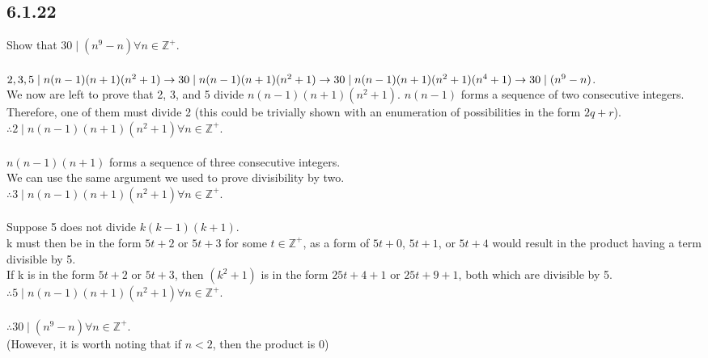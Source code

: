 \documentclass{article}
\begin{document}
\subsection{6.1.22}
Show that $30 \mid (n^9 - n)$\;\;$ \forall n \in \mathbb{Z}^+$.
\\
\\$2,3,5 \mid n(n-1)(n+1)(n^2+1) \rightarrow
\\30 \mid n(n-1)(n+1)(n^2+1) \rightarrow
\\30 \mid n(n-1)(n+1)(n^2+1)(n^4+1) \rightarrow
\\30 \mid (n^9 -n)$.
\\We now are left to prove that 2, 3, and 5 divide $n(n-1)(n+1)(n^2+1)$.
\newpage
 $n(n-1)$ forms a sequence of two consecutive integers.
\\Therefore, one of them must divide 2
(this could be trivially shown with an enumeration of possibilities
in the form $2q+r$).
\\$\therefore 2 \mid n(n-1)(n+1)(n^2+1)$\;\;$ \forall n \in \mathbb{Z}^+$.
\\
\\$n(n-1)(n+1)$ forms a sequence of three consecutive integers.
\\We can use the same argument we used to prove divisibility by two.
\\$\therefore 3 \mid n(n-1)(n+1)(n^2+1)$\;\;$ \forall n \in \mathbb{Z}^+$.
\\
\\Suppose 5 does not divide $k(k-1)(k+1)$.
\\k must then be in the form $5t+2$ or $5t+3$ for some $t \in \mathbb{Z}^+$,
as a form of $5t+0$, $5t+1$, or $5t+4$
would result in the product having a term divisible by 5.
\\If k is in the form $5t+2$ or $5t+3$, then $(k^2+1)$ is in the form
$25t+4+1$ or $25t+9+1$, both which are divisible by 5.
\\$\therefore 5 \mid n(n-1)(n+1)(n^2+1)$\;\;$ \forall n \in \mathbb{Z}^+$.
\\
\\$\therefore 30 \mid (n^9 - n)$\;\;$ \forall n \in \mathbb{Z}^+$.
\\(However, it is worth noting that if $n<2$, then the product is 0)
\end{document}
